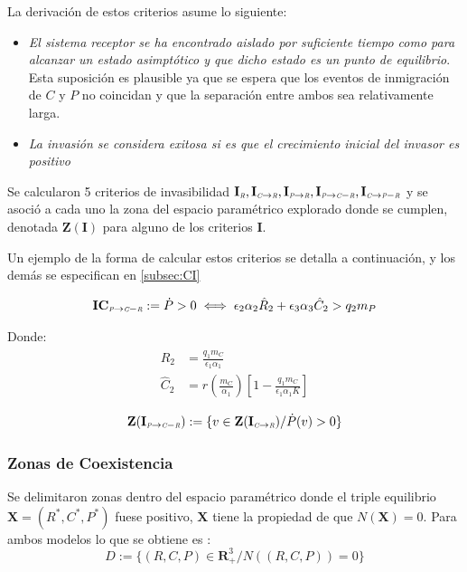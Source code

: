 La derivaci\'on de estos criterios asume lo siguiente:
\begin{itemize}
\item \emph{El sistema receptor se ha encontrado aislado por suficiente tiempo como para alcanzar un estado asimpt\'otico y que dicho estado es un punto de equilibrio}.\\Esta suposici\'on es plausible ya que se espera que los eventos de inmigraci\'on de $C$ y $P$ no coincidan y que la separaci\'on entre ambos sea relativamente larga.
\item \emph{La invasi\'on se considera exitosa si es que el crecimiento inicial del invasor es positivo}
\end{itemize}

Se calcularon 5 criterios de invasibilidad $\mathbf{I_{\textit{\tiny R}},I_{\textit{\tiny C} \to \textit{\tiny R}},I_{\textit{\tiny P} \to \textit{\tiny R}},I_{\textit{\tiny P} \to \textit{\tiny C}-\textit{\tiny R}},I_{\textit{\tiny C} \to \textit{\tiny P}-\textit{\tiny R}}}$ y se asoci\'o a cada uno la zona del espacio param\'etrico explorado donde se cumplen, denotada $\mathbf{Z(I)}$ para alguno de los criterios $\mathbf{I}$.

Un ejemplo de la forma de calcular estos criterios se detalla a continuaci\'on, y los dem\'as se especifican en \ref{subsec:CI} 


\begin{equation} \mathbf{IC_{\textit{\tiny P} \to \textit{\tiny C}-\textit{\tiny R}}} := \dot{P} >0 \iff \epsilon_2\alpha_2\hat{R}_2 + \epsilon_3\alpha_3\hat{C}_2 > q_2 m_P \end{equation}

Donde:
\begin{equation}
\begin{aligned}
\hat{R}_2 &= \frac{q_1 m_C}{\epsilon_1 \alpha_1} \\
\hat{C}_2 &=  r(\frac{m_C}{\alpha_1}) \left[ 1 - \frac{q_1 m_C}{\epsilon_1 \alpha_1 K} \right] 
\end{aligned}
\end{equation}

\begin{equation}
\mathbf{Z(I_{\textit{\tiny P} \to \textit{\tiny C}-\textit{\tiny R}})} := \{ v \in \mathbf{Z(I_{\textit{\tiny C} \to \textit{\tiny R}})} / \dot{P}(v) > 0 \}
\end{equation}


\subsubsection{Zonas de Coexistencia}
Se delimitaron zonas dentro del espacio param\'etrico donde el triple equilibrio $\mathbf{X} = (R^*,C^*,P^*)$ fuese positivo, $\mathbf{X}$ tiene la propiedad de que $N(\mathbf{X}) = 0$. Para ambos modelos lo que se obtiene es :
\begin{equation}\label{eq:Equilibrio}
D:= \{ (R,C,P) \in \mathbf{R}^3_+ / N((R,C,P)) = 0 \}
\end{equation}

